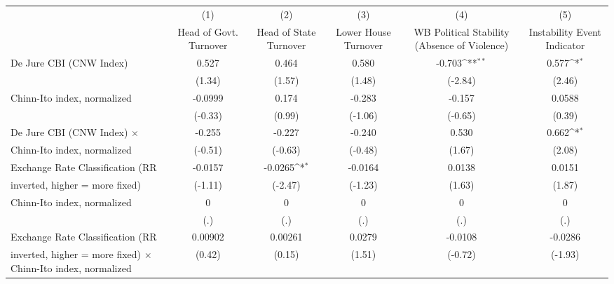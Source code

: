{
\def\sym#1{\ifmmode^{#1}\else\(^{#1}\)\fi}
\begin{tabular}{l*{5}{c}}
\toprule
                                        &\multicolumn{1}{c}{(1)}&\multicolumn{1}{c}{(2)}&\multicolumn{1}{c}{(3)}&\multicolumn{1}{c}{(4)}&\multicolumn{1}{c}{(5)}\\
                                        &\multicolumn{1}{c}{Head of Govt. Turnover}&\multicolumn{1}{c}{Head of State Turnover}&\multicolumn{1}{c}{Lower House Turnover}&\multicolumn{1}{c}{WB Political Stability (Absence of Violence)}&\multicolumn{1}{c}{Instability Event Indicator}\\
\midrule
De Jure CBI (CNW Index)                 &0.527         &0.464         &0.580         &-0.703\sym{**} &0.577\sym{*}  \\
                                        &(1.34)         &(1.57)         &(1.48)         &(-2.84)         &(2.46)         \\
\addlinespace
Chinn-Ito index, normalized             &-0.0999         &0.174         &-0.283         &-0.157         &0.0588         \\
                                        &(-0.33)         &(0.99)         &(-1.06)         &(-0.65)         &(0.39)         \\
\addlinespace
De Jure CBI (CNW Index) $\times$        &-0.255         &-0.227         &-0.240         &0.530         &0.662\sym{*}  \\
Chinn-Ito index, normalized             &(-0.51)         &(-0.63)         &(-0.48)         &(1.67)         &(2.08)         \\
\addlinespace
Exchange Rate Classification (RR        &-0.0157         &-0.0265\sym{*}  &-0.0164         &0.0138         &0.0151         \\
inverted, higher = more fixed)          &(-1.11)         &(-2.47)         &(-1.23)         &(1.63)         &(1.87)         \\
\addlinespace
Chinn-Ito index, normalized             &    0         &    0         &    0         &    0         &    0         \\
                                        &  (.)         &  (.)         &  (.)         &  (.)         &  (.)         \\
\addlinespace
Exchange Rate Classification (RR        &0.00902         &0.00261         &0.0279         &-0.0108         &-0.0286         \\
inverted, higher = more fixed) $\times$ Chinn-Ito index, normalized&(0.42)         &(0.15)         &(1.51)         &(-0.72)         &(-1.93)         \\

\end{tabular}}
